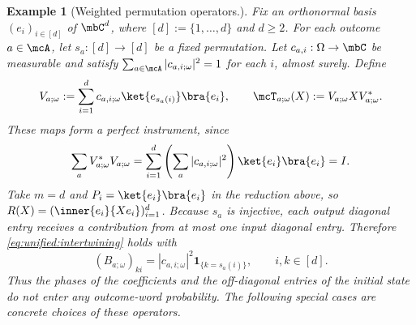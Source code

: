 \documentclass[a4paper]{article}
\numberwithin{equation}{section}   %
\theoremstyle{plain}   %
\theoremstyle{plain}   %
\theoremstyle{examplestyle}
\newtheorem{example}{Example}
\begin{document}
    \begin{example}[Weighted permutation operators.]
    \label{eg:weighted-permutations}
        Fix an orthonormal basis $(e_i)_{i\in [d]}$ of $\mbC^d$, where $[d]:=\{1,\ldots,d\}$ and $d\ge2$.
        For each outcome $a\in\mcA$, let $s_a:[d]\to [d]$ be a fixed permutation.
        Let $c_{a,i}:\Omega\to\mbC$ be measurable and satisfy $\sum_{a\in\mcA}|c_{a,i;\omega}|^2=1$ for each $i$, almost surely.
        Define
        \begin{equation}
        \label{eq:unified:permutations}
             V_{a;\omega}:=\sum_{i=1}^d c_{a,i;\omega}
                   \ket{e_{s_a(i)}}\bra{e_i},
             \qquad \mcT_{a;\omega}(X):=V_{a;\omega}XV_{a;\omega}^*.
        \end{equation}
        These maps form a perfect instrument, since
        \[
         \sum_a V_{a;\omega}^*V_{a;\omega}
         =\sum_{i=1}^d\left(\sum_a|c_{a,i;\omega}|^2\right)
               \ket{e_i}\bra{e_i}=I.
        \]
        Take $m=d$ and $P_i=\ket{e_i}\bra{e_i}$ in the reduction above, so $R(X)=(\inner{e_i}{Xe_i})_{i=1}^d$.
        Because $s_a$ is injective, each output diagonal entry receives a contribution from at most one input diagonal entry. 
        Therefore \eqref{eq:unified:intertwining} holds with
        \[
             (B_{a;\omega})_{ki}
             =|c_{a,i;\omega}|^2\mathbf1_{\{k=s_a(i)\}},
             \qquad i,k\in [d].
        \]
        Thus the phases of the coefficients and the off-diagonal entries of the initial state do not enter any outcome-word probability.
        The following special cases are concrete choices of these operators.
    \end{example}
    
\end{document}
